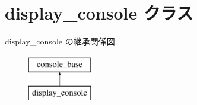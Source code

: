 \hypertarget{classdisplay__console}{}\section{display\+\_\+console クラス}
\label{classdisplay__console}
display\+\_\+console の継承関係図\begin{figure}[H]
\begin{center}
\leavevmode
\includegraphics[height=2.000000cm]{classdisplay__console}
\end{center}
\end{figure}
